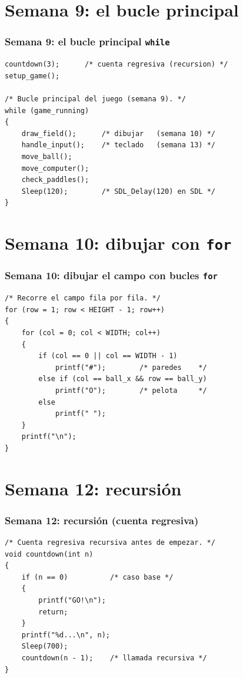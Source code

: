 \documentclass[]{beamer}
\begin{document}
\section{Semana 9: el bucle principal}
\begin{frame}[fragile]
  \frametitle{Semana 9: el bucle principal \texttt{while}}
  \lstset{style=myCStyle}
  \begin{lstlisting}
countdown(3);      /* cuenta regresiva (recursion) */
setup_game();

/* Bucle principal del juego (semana 9). */
while (game_running)
{
    draw_field();      /* dibujar   (semana 10) */
    handle_input();    /* teclado   (semana 13) */
    move_ball();
    move_computer();
    check_paddles();
    Sleep(120);        /* SDL_Delay(120) en SDL */
}
  \end{lstlisting}
\end{frame}

\section{Semana 10: dibujar con \texttt{for}}
\begin{frame}[fragile]
  \frametitle{Semana 10: dibujar el campo con bucles \texttt{for}}
  \lstset{style=myCStyle}
  \begin{lstlisting}
/* Recorre el campo fila por fila. */
for (row = 1; row < HEIGHT - 1; row++)
{
    for (col = 0; col < WIDTH; col++)
    {
        if (col == 0 || col == WIDTH - 1)
            printf("#");        /* paredes    */
        else if (col == ball_x && row == ball_y)
            printf("O");        /* pelota     */
        else
            printf(" ");
    }
    printf("\n");
}
  \end{lstlisting}
\end{frame}

\section{Semana 12: recursión}
\begin{frame}[fragile]
  \frametitle{Semana 12: recursión (cuenta regresiva)}
  \lstset{style=myCStyle}
  \begin{lstlisting}
/* Cuenta regresiva recursiva antes de empezar. */
void countdown(int n)
{
    if (n == 0)          /* caso base */
    {
        printf("GO!\n");
        return;
    }
    printf("%d...\n", n);
    Sleep(700);
    countdown(n - 1);    /* llamada recursiva */
}
  \end{lstlisting}
\end{frame}
\end{document}
